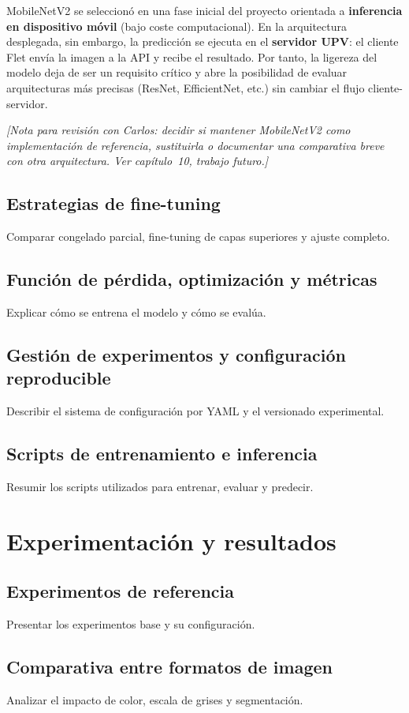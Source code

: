 \documentclass[11pt,spanish,listoffigures,listoftables]{tfgetsinf}
\begin{document}
MobileNetV2 se seleccionó en una fase inicial del proyecto orientada a \textbf{inferencia en dispositivo móvil} (bajo coste computacional). En la arquitectura desplegada, sin embargo, la predicción se ejecuta en el \textbf{servidor UPV}: el cliente Flet envía la imagen a la API y recibe el resultado. Por tanto, la ligereza del modelo deja de ser un requisito crítico y abre la posibilidad de evaluar arquitecturas más precisas (ResNet, EfficientNet, etc.) sin cambiar el flujo cliente-servidor.

\textit{[Nota para revisión con Carlos: decidir si mantener MobileNetV2 como implementación de referencia, sustituirla o documentar una comparativa breve con otra arquitectura. Ver capítulo~10, trabajo futuro.]}

\section{Estrategias de fine-tuning}
Comparar congelado parcial, fine-tuning de capas superiores y ajuste completo.

\section{Función de pérdida, optimización y métricas}
Explicar cómo se entrena el modelo y cómo se evalúa.

\section{Gestión de experimentos y configuración reproducible}
Describir el sistema de configuración por YAML y el versionado experimental.

\section{Scripts de entrenamiento e inferencia}
Resumir los scripts utilizados para entrenar, evaluar y predecir.

\chapter{Experimentación y resultados}
\section{Experimentos de referencia}
Presentar los experimentos base y su configuración.

\section{Comparativa entre formatos de imagen}
Analizar el impacto de color, escala de grises y segmentación.
\end{document}

